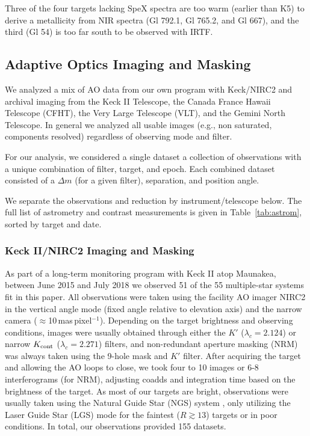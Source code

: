 \documentclass[twocolumn]{aastex62}
\begin{document}
Three of the four targets lacking SpeX spectra are too warm (earlier than K5) to derive a metallicity from NIR spectra (Gl 792.1, Gl 765.2, and Gl 667), and the third (Gl 54) is too far south to be observed with IRTF. 

\subsection{Adaptive Optics Imaging and Masking}\label{sec:ao}

We analyzed a mix of AO data from our own program with Keck/NIRC2 and archival imaging from the Keck II Telescope, the Canada France Hawaii Telescope (CFHT), the Very Large Telescope (VLT), and the Gemini North Telescope. In general we analyzed all usable images (e.g., non saturated, components resolved) regardless of observing mode and filter. 

For our analysis, we considered a single dataset a collection of observations with a unique combination of filter, target, and epoch. Each combined dataset consisted of a $\Delta m$ (for a given filter), separation, and position angle. 

We separate the observations and reduction by instrument/telescope below. The full list of astrometry and contrast measurements is given in Table~\ref{tab:astrom}, sorted by target and date. 

\subsubsection{Keck II/NIRC2 Imaging and Masking}%
As part of a long-term monitoring program with Keck II atop Maunakea, between June 2015 and July 2018 we observed 51 of the 55 multiple-star systems fit in this paper. All observations were taken using the facility AO imager NIRC2 in the vertical angle mode (fixed angle relative to elevation axis) and the narrow camera ($\approx$10\,mas\,pixel$^{-1}$). Depending on the target brightness and observing conditions, images were usually obtained through either the $K'$ ($\lambda_c=2.124$\um) or narrow $K_{\rm{cont}}$ ($\lambda_c=2.271$\um) filters, and non-redundant aperture masking (NRM) was always taken using the 9-hole mask and $K'$ filter. After acquiring the target and allowing the AO loops to close, we took four to 10 images or 6-8 interferograms (for NRM), adjusting coadds and integration time based on the brightness of the target. As most of our targets are bright, observations were usually taken using the Natural Guide Star (NGS) system \citep{2000PASP..112..315W,2004ApOpt..43.5458V}, only utilizing the Laser Guide Star (LGS) mode for the faintest ($R\gtrsim13$) targets or in poor conditions. In total, our observations provided 155 datasets.%
\end{document}
